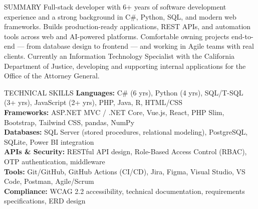 \documentclass{resume}
\begin{document}

\begin{rSection}{SUMMARY}
Full-stack developer with 6+ years of software development experience and a strong background in C\#, Python, SQL, and modern web frameworks. Builds production-ready applications, REST APIs, and automation tools across web and AI-powered platforms. Comfortable owning projects end-to-end --- from database design to frontend --- and working in Agile teams with real clients. Currently an Information Technology Specialist with the California Department of Justice, developing and supporting internal applications for the Office of the Attorney General.
\end{rSection}


\begin{rSection}{TECHNICAL SKILLS}
\textbf{Languages:} C\# (6 yrs), Python (4 yrs), SQL/T-SQL (3+ yrs), JavaScript (2+ yrs), PHP, Java, R, HTML/CSS \\
\textbf{Frameworks:} ASP.NET MVC / .NET Core, Vue.js, React, PHP Slim, Bootstrap, Tailwind CSS, pandas, NumPy \\
\textbf{Databases:} SQL Server (stored procedures, relational modeling), PostgreSQL, SQLite, Power BI integration \\
\textbf{APIs \& Security:} RESTful API design, Role-Based Access Control (RBAC), OTP authentication, middleware \\
\textbf{Tools:} Git/GitHub, GitHub Actions (CI/CD), Jira, Figma, Visual Studio, VS Code, Postman, Agile/Scrum \\
\textbf{Compliance:} WCAG 2.2 accessibility, technical documentation, requirements specifications, ERD design
\end{rSection}

\end{document}
